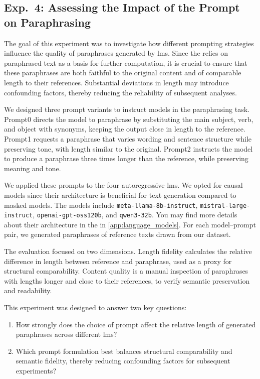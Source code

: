 \subsection{Exp.\ 4: Assessing the Impact of the Prompt on Paraphrasing}
\label{subsec:prompt_impact}

The goal of this experiment was to investigate how different prompting strategies influence the quality of paraphrases generated by \acp{lm}.  
Since the \impAppr{} relies on paraphrased text as a basis for further computation, it is crucial to ensure that these paraphrases are both faithful to the original content and of comparable length to their references.  
Substantial deviations in length may introduce confounding factors, thereby reducing the reliability of subsequent analyses.  

We designed three prompt variants to instruct models in the paraphrasing task.
Prompt0 directs the model to paraphrase by substituting the main subject, verb, and object with synonyms, keeping the output close in length to the reference.  
Prompt1 requests a paraphrase that varies wording and sentence structure while preserving tone, with length similar to the original.  
Prompt2 instructs the model to produce a paraphrase three times longer than the reference, while preserving meaning and tone. 

We applied these prompts to the four autoregressive \acp{lm}. 
We opted for causal models since their architecture is beneficial for text generation compared to masked models.
The models include \texttt{meta-llama-8b-instruct}, \texttt{mistral-large-instruct}, \texttt{openai-gpt-\-oss\-120b}, and \texttt{qwen3-32b}.  
You may find more details about their architecture in the in \autoref{app:language_models}.
For each model–prompt pair, we generated paraphrases of reference texts drawn from our dataset.  


The evaluation focused on two dimensions.
Length fidelity calculates the relative difference in length between reference and paraphrase, used as a proxy for structural comparability.  
Content quality is a manual inspection of paraphrases with lengths longer and close to their references, to verify semantic preservation and readability.  

This experiment was designed to answer two key questions:  
\begin{enumerate}
    \item How strongly does the choice of prompt affect the relative length of generated paraphrases across different \acp{lm}?  
    \item Which prompt formulation best balances structural comparability and semantic fidelity, thereby reducing confounding factors for subsequent \imp{} experiments?  
\end{enumerate}
